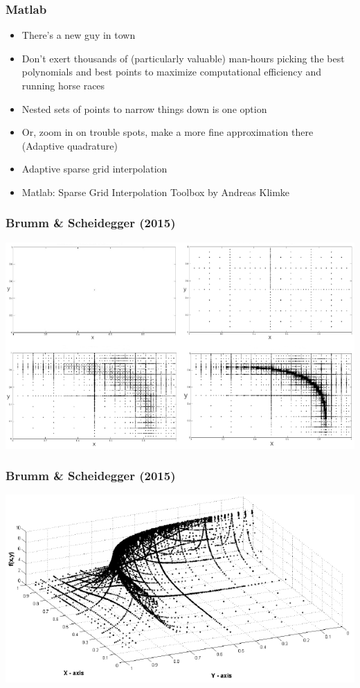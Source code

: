 \documentclass{beamer}
\begin{document}
\begin{frame}
\frametitle[alignment=center]{Matlab}
\begin{itemize}
\item There's a new guy in town
\bigskip
\item Don't exert thousands of (particularly valuable) man-hours picking the best polynomials and best points to maximize computational efficiency and running horse races
\bigskip
\item Nested sets of points to narrow things down is one option
\bigskip
\item Or, zoom in on trouble spots, make a more fine approximation there (Adaptive quadrature)
\bigskip
\item Adaptive sparse grid interpolation
\bigskip
\item Matlab: Sparse Grid Interpolation Toolbox by Andreas Klimke
\end{itemize}
\end{frame}

\begin{frame}
\frametitle[alignment=center]{Brumm \& Scheidegger (2015)}
\includegraphics[scale=0.4]{Brumm_Scheidegger_2015_1.png}
\end{frame}

\begin{frame}
\frametitle[alignment=center]{Brumm \& Scheidegger (2015)}
\includegraphics[scale=0.4]{Brumm_Scheidegger_2015_2.png}
\end{frame}
\end{document}

